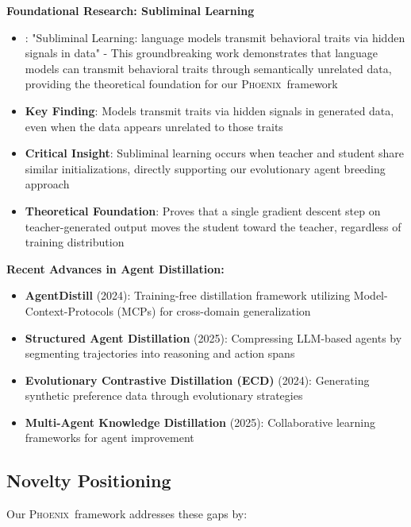 \documentclass[10pt]{article}
\theoremstyle{definition}
\newcommand{\phoenix}{\textsc{Phoenix}}
\newcommand{\mcp}{\textsc{MCP}}
\newcommand{\llm}{\textsc{LLM}}
\begin{document}
\textbf{Foundational Research: Subliminal Learning}

\begin{itemize}
    \item \textbf{\cite{cloud2025subliminal}}: "Subliminal Learning: language models transmit behavioral traits via hidden signals in data" - This groundbreaking work demonstrates that language models can transmit behavioral traits through semantically unrelated data, providing the theoretical foundation for our \phoenix\ framework
    \item \textbf{Key Finding}: Models transmit traits via hidden signals in generated data, even when the data appears unrelated to those traits
    \item \textbf{Critical Insight}: Subliminal learning occurs when teacher and student share similar initializations, directly supporting our evolutionary agent breeding approach
    \item \textbf{Theoretical Foundation}: Proves that a single gradient descent step on teacher-generated output moves the student toward the teacher, regardless of training distribution
\end{itemize}

\textbf{Recent Advances in Agent Distillation:}

\begin{itemize}
    \item \textbf{AgentDistill} (2024): Training-free distillation framework utilizing Model-Context-Protocols (\mcp s) for cross-domain generalization
    \item \textbf{Structured Agent Distillation} (2025): Compressing \llm-based agents by segmenting trajectories into reasoning and action spans
    \item \textbf{Evolutionary Contrastive Distillation (ECD)} (2024): Generating synthetic preference data through evolutionary strategies
    \item \textbf{Multi-Agent Knowledge Distillation} (2025): Collaborative learning frameworks for agent improvement
\end{itemize}

\subsection{Novelty Positioning}

Our \phoenix\ framework addresses these gaps by:
\end{document}
